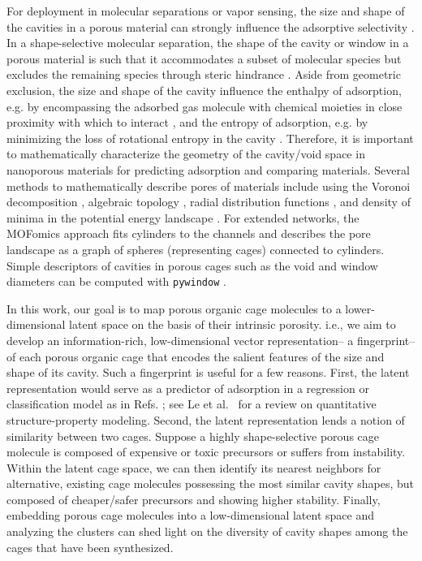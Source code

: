 \documentclass[journal=jacsat,manuscript=article,layout=traditional]{achemso}
\begin{document}
For deployment in molecular separations or vapor sensing, the size and shape of the cavities in a porous material can strongly influence the adsorptive selectivity \cite{mitra2013molecular,zhu1999shape,lee2018high,smit2008towards,sikora2012thermodynamic}. In a shape-selective molecular separation, the shape of the cavity or window in a porous material is such that it accommodates a subset of molecular species but excludes the remaining species through steric hindrance \cite{smit2008towards}. Aside from geometric exclusion, the size and shape of the cavity influence the enthalpy of adsorption, e.g. by encompassing the adsorbed gas molecule with chemical moieties in close proximity with which to interact \cite{simon2015best}, and the entropy of adsorption, e.g. by minimizing the loss of rotational entropy in the cavity \cite{denayer2005rotational}. Therefore, it is important to mathematically characterize the geometry of the cavity/void space in nanoporous materials for predicting adsorption and comparing materials. Several methods to mathematically describe pores of materials include using the Voronoi decomposition \cite{pinheiro2013characterization,martin2011addressing}, algebraic topology \cite{lee2017quantifying}, radial distribution functions \cite{fernandez2013atomic}, and density of minima in the potential energy landscape \cite{oganov2009quantify}. For extended networks, the MOFomics \cite{first2013mofomics} approach fits cylinders to the channels and describes the pore landscape as a graph of spheres (representing cages) connected to cylinders. Simple descriptors of cavities in porous cages such as the void and window diameters can be computed with \texttt{pywindow} \cite{miklitz2018pywindow}.

In this work, our goal is to map porous organic cage molecules to a lower-dimensional latent space on the basis of their intrinsic porosity. i.e., we aim to develop an information-rich, low-dimensional vector representation-- a fingerprint-- of each porous organic cage that encodes the salient features of the size and shape of its cavity. Such a fingerprint is useful for a few reasons. First, the latent representation would serve as a predictor of adsorption in a regression or classification model as in Refs. \cite{bucior2018energy,simon2015best}; see Le et al.~\cite{le2012quantitative} for a review on quantitative structure-property modeling. Second, the latent representation lends a notion of similarity between two cages. Suppose a highly shape-selective porous cage molecule is composed of expensive or toxic precursors or suffers from instability. Within the latent cage space, we can then identify its nearest neighbors for alternative, existing cage molecules possessing the most similar cavity shapes, but composed of cheaper/safer precursors and showing higher stability. Finally, embedding porous cage molecules into a low-dimensional latent space and analyzing the clusters can shed light on the diversity of  cavity shapes among the cages that have been synthesized.
\end{document}
